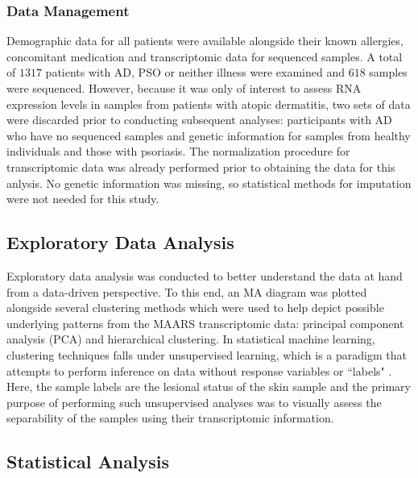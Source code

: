 \documentclass[journal, a4paper]{IEEEtran}
\begin{document}

\subsubsection*{Data Management}

Demographic data for all patients were available alongside their known allergies, concomitant medication and transcriptomic data for sequenced samples. A total of $1317$ patients with AD, PSO or neither illness were examined and $618$ samples were sequenced. However, because it was only of interest to assess RNA expression levels in samples from patients with atopic dermatitis, two sets of data were discarded prior to conducting subsequent analyses: participants with AD who have no sequenced samples and genetic information for samples from healthy individuals and those with psoriasis. The normalization procedure for transcriptomic data was already performed prior to obtaining the data for this anlysis. No genetic information was missing, so statistical methods for imputation were not needed for this study.


\subsection{Exploratory Data Analysis}

Exploratory data analysis was conducted to better understand the data at hand from a data-driven perspective. To this end, an MA diagram was plotted alongside several clustering methods which were used to help depict possible underlying patterns from the MAARS transcriptomic data: principal component analysis (PCA) and hierarchical clustering\cite{maaten2008visualizing, friedman2001elements}. In statistical machine learning, clustering techniques falls under unsupervised learning, which is a paradigm that attempts to perform inference on data without response variables or ``labels" \cite{friedman2001elements}. Here, the sample labels are the lesional status of the skin sample and the primary purpose of performing such unsupervised analyses was to visually assess the separability of the samples using their transcriptomic information.

\subsection{Statistical Analysis}

\end{document}
